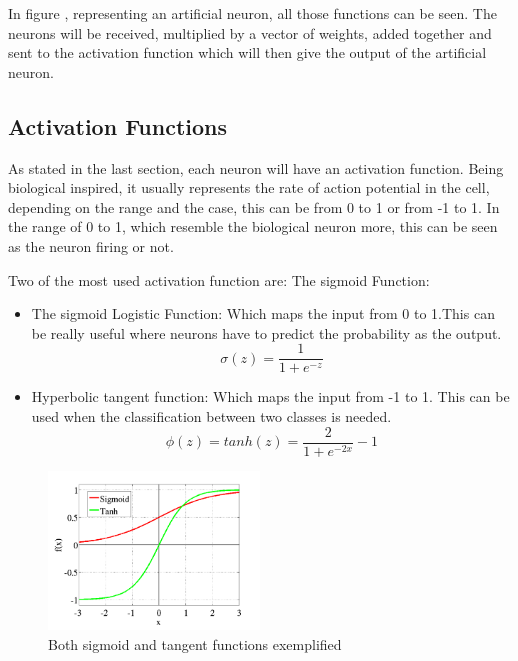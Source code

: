 In figure , representing an artificial neuron, all those functions can be seen. The neurons will be received, multiplied by a vector of weights, added together and sent to the activation function which will then give the output of the artificial neuron.

\subsection{Activation Functions}

As stated in the last section, each neuron will have an activation function. Being biological inspired, it usually represents the rate of action potential in the cell, depending on the range and the case, this can be from 0 to 1 or from -1 to 1. In the range of 0 to 1, which resemble the biological neuron more, this can be seen as the neuron firing or not.

Two of the most used activation function are:
The sigmoid Function:

\begin{itemize}
\item The sigmoid Logistic Function: Which maps the input from 0 to 1.This can be really useful where neurons have to predict the probability as the output.
\begin{equation}
 \sigma(z) = \frac{1}{1+e^{-z}}
\end{equation}

\item Hyperbolic tangent function: Which maps the input from -1 to 1. This can be used when the classification between two classes is needed.
\begin{equation}
 \phi(z) = tanh(z)= \frac{2}{1+e^{-2x}}-1
\end{equation}

\end{itemize}

\begin{figure}[htp]
	\centering
	\includegraphics[width=0.5\textwidth]{Illustrations/sigmoidandtangent.jpeg}
	\caption{Both sigmoid and tangent functions exemplified}
	\label{fig:SigmoidAndTangent}
\end{figure}

